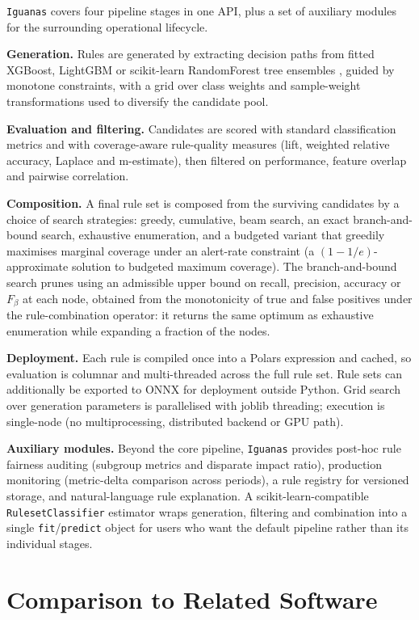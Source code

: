 \documentclass[twoside,11pt]{article}
\begin{document}
\texttt{Iguanas} covers four pipeline stages in one API, plus a set of
auxiliary modules for the surrounding operational lifecycle.

\textbf{Generation.} Rules are generated by extracting decision paths from
fitted XGBoost, LightGBM or scikit-learn RandomForest tree ensembles
\citep{chen2016,ke2017,pedregosa2011}, guided by monotone constraints, with a
grid over class weights and sample-weight transformations used to diversify
the candidate pool.

\textbf{Evaluation and filtering.} Candidates are scored with standard
classification metrics and with coverage-aware rule-quality measures (lift,
weighted relative accuracy, Laplace and m-estimate), then filtered on
performance, feature overlap and pairwise correlation.

\textbf{Composition.} A final rule set is composed from the surviving
candidates by a choice of search strategies: greedy, cumulative, beam search,
an exact branch-and-bound search, exhaustive enumeration, and a budgeted
variant that greedily maximises marginal coverage under an alert-rate
constraint (a $(1-1/e)$-approximate solution to budgeted maximum coverage).
The branch-and-bound search prunes using an admissible upper bound on recall,
precision, accuracy or $F_\beta$ at each node, obtained from the monotonicity
of true and false positives under the rule-combination operator: it returns
the same optimum as exhaustive enumeration while expanding a fraction of the
nodes.

\textbf{Deployment.} Each rule is compiled once into a Polars \citep{polars}
expression and cached, so evaluation is columnar and multi-threaded across the
full rule set. Rule sets can additionally be exported to ONNX for deployment
outside Python. Grid search over generation parameters is parallelised with
joblib threading; execution is single-node (no multiprocessing, distributed
backend or GPU path).

\textbf{Auxiliary modules.} Beyond the core pipeline, \texttt{Iguanas}
provides post-hoc rule fairness auditing (subgroup metrics and disparate
impact ratio), production monitoring (metric-delta comparison across periods),
a rule registry for versioned storage, and natural-language rule explanation.
A scikit-learn-compatible \texttt{RulesetClassifier} estimator wraps
generation, filtering and combination into a single \texttt{fit}/\texttt{predict}
object for users who want the default pipeline rather than its individual
stages.

\section{Comparison to Related Software}
\end{document}
